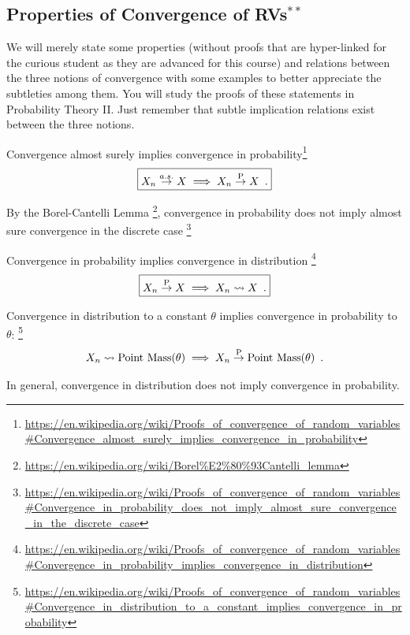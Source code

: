 \subsection{Properties of Convergence of RVs$^{**}$}

We will merely state some properties (without proofs that are hyper-linked for the curious student as they are advanced for this course) and relations between the three notions of convergence with some examples to better appreciate the subtleties among them. 
You will study the proofs of these statements in Probability Theory II. 
Just remember that subtle implication relations exist between the three notions.





\bit
\item Convergence almost surely implies convergence in probability\footnote{{\tiny \url{https://en.wikipedia.org/wiki/Proofs\_of\_convergence\_of\_random\_variables\#Convergence\_almost\_surely\_implies\_convergence\_in\_probability}}}
\[
\boxed{X_n \overset{a.s.}{\to} X \implies X_n \overset{\P}{\to} X \enspace .}
\]
\item By the Borel-Cantelli Lemma \footnote{{\tiny \url{https://en.wikipedia.org/wiki/Borel\%E2\%80\%93Cantelli\_lemma}}}, convergence in probability does not imply almost sure convergence in the discrete case \footnote{{\tiny \url{https://en.wikipedia.org/wiki/Proofs_of_convergence_of_random_variables\#Convergence_in_probability_does_not_imply_almost_sure_convergence_in_the_discrete_case}}}
\item Convergence in probability implies convergence in distribution \footnote{{\tiny \url{https://en.wikipedia.org/wiki/Proofs_of_convergence_of_random_variables\#Convergence_in_probability_implies_convergence_in_distribution}}} 
\[
\boxed{X_n \overset{\P}{\to} X \implies X_n \rightsquigarrow X \enspace .}
\]
\item Convergence in distribution to a constant $\theta$ implies convergence in probability to $\theta$: \footnote{{\tiny \url{https://en.wikipedia.org/wiki/Proofs_of_convergence_of_random_variables\#Convergence_in_distribution_to_a_constant_implies_convergence_in_probability}}}
\[
X_n \rightsquigarrow \pointmass(\theta) \implies X_n \overset{\P}{\to} \pointmass(\theta) \enspace . 
\] 
\item In general, convergence in distribution does not imply convergence in probability.  %
\eit


